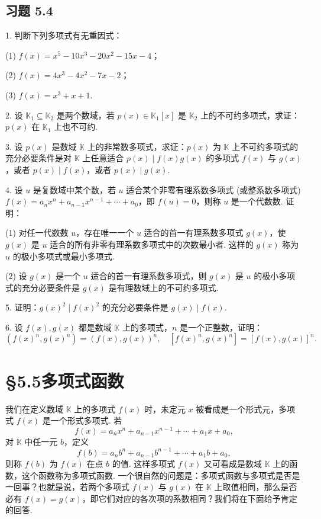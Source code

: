 \documentclass[UTF8,12pt,a4paper,fontset=fandol]{ctexart}
\begin{document}
\subsection*{习题 5.4}

1. 判断下列多项式有无重因式：

(1) $f(x)=x^5-10x^3-20x^2-15x-4$；

(2) $f(x)=4x^3-4x^2-7x-2$；

(3) $f(x)=x^3+x+1$.

2. 设 $\mathbb{K}_1\subseteq\mathbb{K}_2$ 是两个数域，若 $p(x)\in\mathbb{K}_1[x]$ 是 $\mathbb{K}_2$ 上的不可约多项式，求证：$p(x)$ 在 $\mathbb{K}_1$ 上也不可约.

3. 设 $p(x)$ 是数域 $\mathbb{K}$ 上的非常数多项式，求证：$p(x)$ 为 $\mathbb{K}$ 上不可约多项式的充分必要条件是对 $\mathbb{K}$ 上任意适合 $p(x)\mid f(x)g(x)$ 的多项式 $f(x)$ 与 $g(x)$，或者 $p(x)\mid f(x)$，或者 $p(x)\mid g(x)$.

4. 设 $u$ 是复数域中某个数，若 $u$ 适合某个非零有理系数多项式 (或整系数多项式) $f(x)=a_nx^n+a_{n-1}x^{n-1}+\cdots+a_0$，即 $f(u)=0$，则称 $u$ 是一个代数数. 证明：

(1) 对任一代数数 $u$，存在唯一一个 $u$ 适合的首一有理系数多项式 $g(x)$，使 $g(x)$ 是 $u$ 适合的所有非零有理系数多项式中的次数最小者. 这样的 $g(x)$ 称为 $u$ 的极小多项式或最小多项式.

(2) 设 $g(x)$ 是一个 $u$ 适合的首一有理系数多项式，则 $g(x)$ 是 $u$ 的极小多项式的充分必要条件是 $g(x)$ 是有理数域上的不可约多项式.

5. 证明：$g(x)^2\mid f(x)^2$ 的充分必要条件是 $g(x)\mid f(x)$.

6. 设 $f(x),g(x)$ 都是数域 $\mathbb{K}$ 上的多项式，$n$ 是一个正整数，证明：
\[
(f(x)^n,g(x)^n)=(f(x),g(x))^n,\quad [f(x)^n,g(x)^n]=[f(x),g(x)]^n.
\]

\section*{§5.5\quad 多项式函数}

我们在定义数域 $\mathbb{K}$ 上的多项式 $f(x)$ 时，未定元 $x$ 被看成是一个形式元，多项式 $f(x)$ 是一个形式多项式. 若
\[
f(x)=a_nx^n+a_{n-1}x^{n-1}+\cdots+a_1x+a_0,
\]
对 $\mathbb{K}$ 中任一元 $b$，定义
\[
f(b)=a_nb^n+a_{n-1}b^{n-1}+\cdots+a_1b+a_0,
\]
则称 $f(b)$ 为 $f(x)$ 在点 $b$ 的值. 这样多项式 $f(x)$ 又可看成是数域 $\mathbb{K}$ 上的函数，这个函数称为多项式函数. 一个很自然的问题是：多项式函数与多项式是否是一回事？也就是说，若两个多项式 $f(x)$ 与 $g(x)$ 在 $\mathbb{K}$ 上取值相同，那么是否必有 $f(x)=g(x)$，即它们对应的各次项的系数相同？我们将在下面给予肯定的回答.
\end{document}
